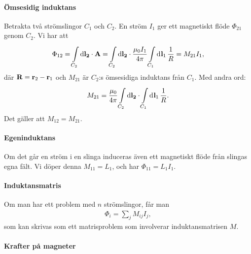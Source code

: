 \paragraph{Ömsesidig induktans}
Betrakta två strömslingor $C_{1}$ och $C_{2}$. En ström $I_{1}$ ger ett magnetiskt flöde $\Phi_{21}$ genom $C_{2}$. Vi har att
\begin{align*}
	\Phi_{12} = \int\limits_{C_{2}}^{}\dd{\vb{l_{2}}}\cdot \vb{A} = \int\limits_{C_{2}}^{}\dd{\vb{l_{2}}}\cdot \frac{\mu_{0}I_{1}}{4\pi}\int\limits_{C_{1}}^{}\dd[]{\vb{l}_{1}}\frac{1}{R} = M_{21}I_{1},
\end{align*}
där $\vb{R} = \vb{r}_{2} - \vb{r}_{1}$ och $M_{21}$ är $C_{2}$:s ömsesidiga induktans från $C_{1}$. Med andra ord:
\begin{align*}
	M_{21} = \frac{\mu_{0}}{4\pi}\int\limits_{C_{2}}^{}\dd{\vb{l_{2}}}\cdot \int\limits_{C_{1}}^{}\dd[]{\vb{l}_{1}}\frac{1}{R}.
\end{align*}
Det gäller att $M_{12} = M_{21}$.

\paragraph{Egeninduktans}
Om det går en ström i en slinga induceras även ett magnetiskt flöde från slingas egna fält. Vi döper denna $M_{11} = L_{1}$, och har $\Phi_{11} = L_{1}I_{1}$.

\paragraph{Induktansmatris}
Om man har ett problem med $n$ strömslingor, får man
\begin{align*}
	\Phi_{i} = \sum\limits_{j}M_{ij}I_{j},
\end{align*}
som kan skrivas som ett matrisproblem som involverar induktansmatrisen $M$.

\paragraph{Krafter på magneter}
